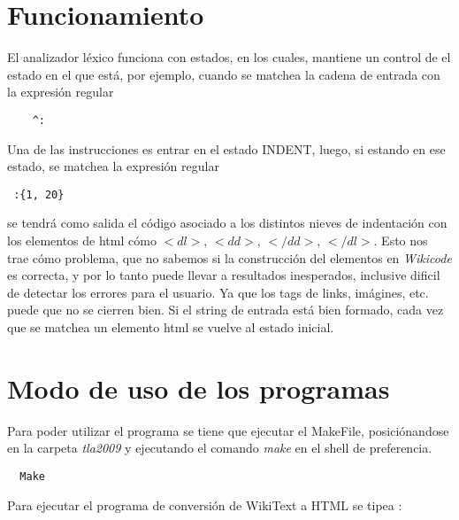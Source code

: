 \documentclass[a4paper,11pt]{article}
\begin{document}
\section {Funcionamiento}
	El analizador léxico funciona con estados, en los cuales, mantiene un control de el estado en el que está, por ejemplo, cuando se matchea la cadena de entrada
	con la expresión regular\\
\begin{center}
\begin{verbatim}
	^:
\end{verbatim}
\end{center}
	Una de las instrucciones es entrar en el estado INDENT, luego, si estando en ese estado, se matchea la expresión regular\\
\begin{center}
\begin{verbatim}
 :{1, 20}
\end{verbatim}
\end{center}
	se tendrá como salida el código asociado a los distintos nieves de indentación con los elementos de html cómo $<dl>$, $<dd>$, $</dd>$, $</dl>$.
	 Esto nos trae cómo problema, que no sabemos si la construcción del elementos en \emph{Wikicode} es correcta, y por lo tanto puede llevar a resultados inesperados, inclusive dificil de detectar los errores para el usuario. Ya que los tags de links, imágines, etc. puede que no se cierren bien. Si el string
	 de entrada está bien formado, cada vez que se matchea un elemento html se vuelve al estado inicial.

	




\section {Modo de uso de los programas}

Para poder utilizar el programa se tiene que ejecutar el MakeFile, posici\'onandose en la carpeta \emph{tla2009} y ejecutando el comando \emph{make} en el shell de preferencia.\\
\begin{center}
 \begin{verbatim}
  Make
 \end{verbatim}
\end{center}

Para ejecutar el programa de conversi\'on de WikiText a HTML se tipea : \\
\end{document}
